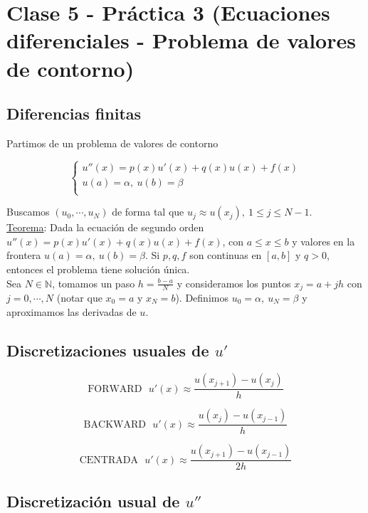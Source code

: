\section{Clase 5 - Pr\'actica 3 (Ecuaciones diferenciales - Problema de valores de contorno)}

\subsection{Diferencias finitas}

Partimos de un problema de valores de contorno

$$ 
	\begin{cases}
        u''(x) = p(x)u'(x) + q(x)u(x) + f(x)\\
        u(a) = \alpha,\ u(b) = \beta \\
    \end{cases}
$$

Buscamos $(u_{0}, \cdots, u_{N})$ de forma tal que $u_{j} \approx u(x_{j}),\ 1 \leq j \leq N - 1$.\\

\underline{Teorema}: Dada la ecuaci\'on de segundo orden $u''(x) = p(x)u'(x) + q(x)u(x) + f(x)$, con $a \leq x \leq b$ y valores en la frontera $u(a) = \alpha,\ u(b) = \beta$. Si $p, q, f$ son continuas en $[a, b]$ y $q > 0$, entonces el problema tiene soluci\'on \'unica.\\

Sea $N \in \mathbb{N}$, tomamos un paso $h = \frac{b - a}{N}$ y consideramos los puntos $x_{j} = a + jh$ con $j = 0, \cdots, N$ (notar que $x_{0} = a$ y $x_{N} = b$). Definimos $u_{0} = \alpha,\ u_{N} = \beta$ y aproximamos las derivadas de $u$.\\

\subsection{Discretizaciones usuales de $u'$}

$$\text{FORWARD}\ \ \ u'(x) \approx \frac{u(x_{j + 1}) - u(x_{j})}{h}$$

$$\text{BACKWARD}\ \ \ u'(x) \approx \frac{u(x_{j}) - u(x_{j - 1})}{h}$$

$$\text{CENTRADA}\ \ \ u'(x) \approx \frac{u(x_{j + 1}) - u(x_{j - 1})}{2h}$$

\subsection{Discretizaci\'on usual de $u''$}

